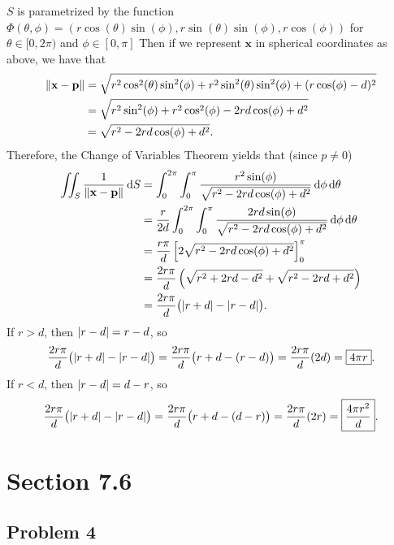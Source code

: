 \documentclass[11pt]{article}
\renewcommand{\vec}[1]{\mathbf{#1}}
\begin{document}
$S$ is parametrized by the function $\Phi(\theta, \phi) = (r \cos(\theta) \sin(\phi), r \sin(\theta) \sin(\phi), r \cos(\phi))$ for $\theta \in [0, 2\pi)$ and $\phi \in [0, \pi]$ Then if we represent $\vec{x}$ in spherical coordinates as above, we have that
\begin{align*}
	\norm{\vec{x} - \vec{p}} &= \sqrt{r^{2} \cos^{2}(\theta) \sin^{2}(\phi) + r^{2} \sin^{2}(\theta)\sin^{2}(\phi) + (r \cos(\phi) - d)^{2}} \\
	&= \sqrt{r^{2}\sin^{2}(\phi) + r^{2}\cos^{2}(\phi) - 2rd \cos(\phi) + d^{2}} \\
	&= \sqrt{r^{2} - 2 rd \cos(\phi) + d^{2}}.
\end{align*}
Therefore, the Change of Variables Theorem yields that (since $p \ne 0$)
\begin{align*}
	\iint_{S} \frac{1}{\norm{\vec{x} - \vec{p}}} \dd{S} &= \int_{0}^{2\pi} \int_{0}^{\pi} \frac{r^{2} \sin(\phi)}{\sqrt{r^{2} - 2rd \cos(\phi) + d^{2}}} \dd{\phi} \dd{\theta} \\
	&= \frac{r}{2d}\int_{0}^{2\pi} \int_{0}^{\pi} \frac{2rd \sin(\phi)}{\sqrt{r^{2} - 2rd \cos(\phi) + d^{2}}} \dd{\phi} \dd{\theta} \\
	&= \frac{r\pi}{d} \left[ 2 \sqrt{r^{2} - 2rd \cos(\phi) + d^{2}} \right]_{0}^{\pi} \\
	&= \frac{2r\pi}{d} \left( \sqrt{r^{2} + 2rd - d^{2}} + \sqrt{r^{2} - 2rd + d^{2}} \right) \\
	&= \frac{2r \pi}{d} \big( \abs{r + d} - \abs{r - d} \big).
\end{align*}
If $r > d$, then $\abs{r - d} = r - d$, so
\[
	\frac{2r \pi}{d} \big( \abs{r + d} - \abs{r - d} \big) = \frac{2r \pi}{d} \big( r + d - (r - d) \big) = \frac{2r \pi}{d} (2d) = \boxed{4\pi r}.
\]
If $r < d$, then $\abs{r - d} = d - r$, so
\[
	\frac{2r \pi}{d} \big( \abs{r + d} - \abs{r - d} \big) = \frac{2r \pi}{d} \big( r + d - (d - r) \big) = \frac{2r \pi}{d} (2r) = \boxed{\frac{4\pi r^{2}}{d}}.
\]

\section{Section 7.6}


\subsection*{Problem 4}
\end{document}
